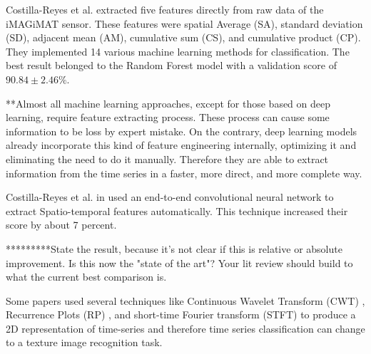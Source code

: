 Costilla-Reyes et al. \cite{Costilla-Reyes2016TemporalSystem} extracted five features directly from raw data of the iMAGiMAT sensor. These features were spatial Average (SA), standard deviation (SD), adjacent mean (AM), cumulative sum (CS), and cumulative product (CP).
They implemented 14 various machine learning methods for classification. The best result belonged to the Random Forest model with a validation score of $90.84 \pm 2.46\%$. 


**Almost all machine learning approaches, except for those based on deep learning, require feature extracting process. These process can cause some information to be loss by expert mistake. On the contrary, deep learning models already incorporate this kind of feature engineering internally, optimizing it and eliminating the need to do it manually. Therefore they are able to extract information from the time series in a faster, more direct, and more complete way.

Costilla-Reyes et al. in \cite{Costilla-Reyes2018DeepSensors} used an end-to-end convolutional neural network to extract Spatio-temporal features automatically. This technique increased their score by about 7 percent.

*********State the result, because it's not clear if this is relative or absolute improvement.  Is this now the "state of the art"?  Your lit review should build to what the current best comparison is.

 Some papers used several techniques like Continuous Wavelet Transform (CWT) \cite{Wang2021AutomaticNetwork}, Recurrence Plots (RP) \cite{Hatami2017ClassificationNetworks}, and short-time Fourier transform (STFT) \cite{Huang2019ECGNetwork} to produce a 2D representation of time-series and therefore time series classification can change to a texture image recognition task. 


